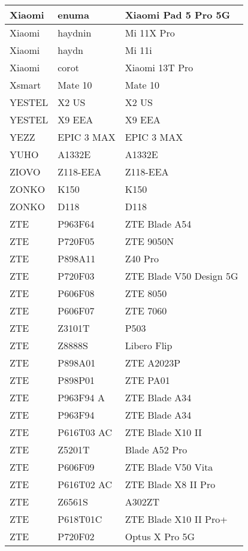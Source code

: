\begin{tabularx}{\linewidth}{|l|X|X|}
        Xiaomi & enuma & Xiaomi Pad 5 Pro 5G \\ \hline
        Xiaomi & haydnin & Mi 11X Pro \\ \hline
        Xiaomi & haydn & Mi 11i \\ \hline
        Xiaomi & corot & Xiaomi 13T Pro \\ \hline
        Xsmart & Mate 10 & Mate 10 \\ \hline
        YESTEL & X2 US & X2 US \\ \hline
        YESTEL & X9 EEA & X9 EEA \\ \hline
        YEZZ & EPIC 3 MAX & EPIC 3 MAX \\ \hline
        YUHO & A1332E & A1332E \\ \hline
        ZIOVO & Z118-EEA & Z118-EEA \\ \hline
        ZONKO & K150 & K150 \\ \hline
        ZONKO & D118 & D118 \\ \hline
        ZTE & P963F64 & ZTE Blade A54 \\ \hline
        ZTE & P720F05 & ZTE 9050N \\ \hline
        ZTE & P898A11 & Z40 Pro \\ \hline
        ZTE & P720F03 & ZTE Blade V50 Design 5G \\ \hline
        ZTE & P606F08 & ZTE 8050 \\ \hline
        ZTE & P606F07 & ZTE 7060 \\ \hline
        ZTE & Z3101T & P503 \\ \hline
        ZTE & Z8888S & Libero Flip \\ \hline
        ZTE & P898A01 & ZTE A2023P \\ \hline
        ZTE & P898P01 & ZTE PA01 \\ \hline
        ZTE & P963F94 A & ZTE Blade A34 \\ \hline
        ZTE & P963F94 & ZTE Blade A34 \\ \hline
        ZTE & P616T03 AC & ZTE Blade X10 II \\ \hline
        ZTE & Z5201T & Blade A52 Pro \\ \hline
        ZTE & P606F09 & ZTE Blade V50 Vita \\ \hline
        ZTE & P616T02 AC & ZTE Blade X8 II Pro \\ \hline
        ZTE & Z6561S & A302ZT \\ \hline
        ZTE & P618T01C & ZTE Blade X10 II Pro+ \\ \hline
        ZTE & P720F02 & Optus X Pro 5G \\ \hline

\end{tabularx}
